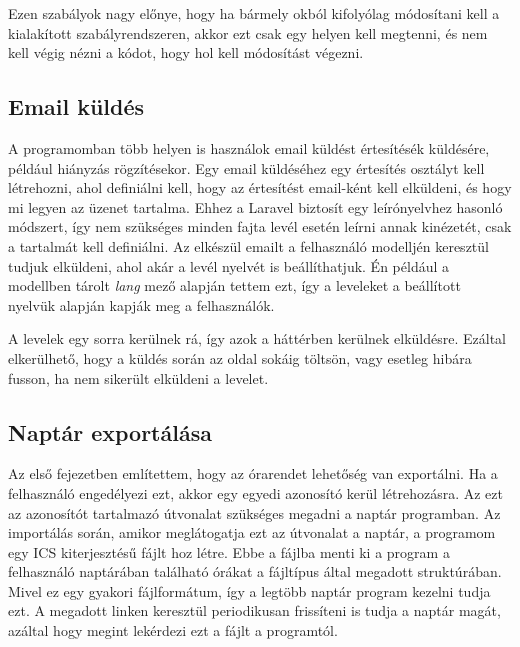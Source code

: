 \documentclass[
]{thesis-ekf}
\theoremstyle{definition}
\theoremstyle{remark}
\begin{document}




Ezen szabályok nagy előnye, hogy ha bármely okból kifolyólag módosítani kell a kialakított szabályrendszeren, akkor ezt csak egy helyen kell megtenni, és nem kell végig nézni a kódot, hogy hol kell módosítást végezni.

\subsection{Email küldés}

A programomban több helyen is használok email küldést értesítésék küldésére, például hiányzás rögzítésekor. Egy email küldéséhez egy értesítés osztályt kell létrehozni, ahol definiálni kell, hogy az értesítést email-ként kell elküldeni, és hogy mi legyen az üzenet tartalma. Ehhez a Laravel biztosít egy leírónyelvhez hasonló módszert, így nem szükséges minden fajta levél esetén leírni annak kinézetét, csak a tartalmát kell definiálni.\cite{mail} Az elkészül emailt a felhasználó modelljén keresztül tudjuk elküldeni, ahol akár a levél nyelvét is beállíthatjuk. Én például a modellben tárolt \emph{lang} mező alapján tettem ezt, így a leveleket a beállított nyelvük alapján kapják meg a felhasználók.

A levelek egy sorra kerülnek rá, így azok a háttérben kerülnek elküldésre. Ezáltal elkerülhető, hogy a küldés során az oldal sokáig töltsön, vagy esetleg hibára fusson, ha nem sikerült elküldeni a levelet.



\subsection{Naptár exportálása}

Az első fejezetben említettem, hogy az órarendet lehetőség van exportálni. Ha a felhasználó engedélyezi ezt, akkor egy egyedi azonosító kerül létrehozásra. Az ezt az azonosítót tartalmazó útvonalat szükséges megadni a naptár programban. Az importálás során, amikor meglátogatja ezt az útvonalat a naptár, a programom egy ICS kiterjesztésű fájlt hoz létre. Ebbe a fájlba menti ki a program a felhasználó naptárában található órákat a fájltípus által megadott struktúrában.\cite{icsFormat} Mivel ez egy gyakori fájlformátum, így a legtöbb naptár program kezelni tudja ezt. A megadott linken keresztül periodikusan frissíteni is tudja a naptár magát, azáltal hogy megint lekérdezi ezt a fájlt a programtól.
\end{document}
